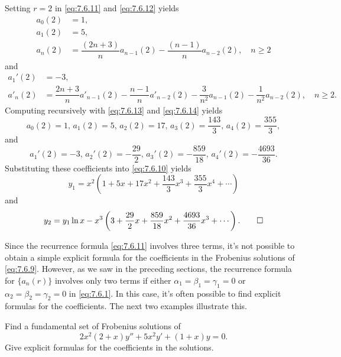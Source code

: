 \begin{solution}
Setting $r=2$ in \eqref{eq:7.6.11} and \eqref{eq:7.6.12} yields
\begin{equation} \label{eq:7.6.13}
\begin{aligned}
a_0(2)&=1,\\
a_1(2)&=5,\\
a_n(2)&=\dfrac{(2n+3)}{n}
a_{n-1}(2)-\dfrac{(n-1)}{n}a_{n-2}(2),\quad n\ge2
\end{aligned}
\end{equation}
and
\begin{equation} \label{eq:7.6.14}
\begin{aligned}
a_1'(2)&=-3,\\
a'_n(2)&=\dfrac{2n+3}{n}a'_{n-1}(2)-\dfrac{n-1}{n}a'_{n-2}(2)
-\dfrac{3}{n^2}a_{n-1}(2)-\dfrac{1}{n^2}a_{n-2}(2),\quad n\ge2.
\end{aligned}
\end{equation}
Computing recursively with \eqref{eq:7.6.13} and \eqref{eq:7.6.14}
yields
\[
a_0(2)=1,\,a_1(2)=5,\,a_2(2)=17,\,a_3(2)=\frac{143}{3},\,a_4(2)=\frac{355}{3},
\]
and
\[
a_1'(2)=-3,\,a_2'(2)=-\frac{29}{2},\,a_3'(2)=-\frac{859}{18},
\,a_4'(2)=-\frac{4693}{36}.
\]
Substituting these coefficients into \eqref{eq:7.6.10} yields
\[
y_1=x^2\left(1+5x+17x^2+\frac{143}{3}x^3
+\frac{355}{3}x^4+\cdots\right)
\]
and
\[
y_2=y_1 \ln x
-x^3\left(3+\frac{29}{2}x+\frac{859}{18}x^2+\frac{4693}{36}x^3
+\cdots\right). \qedhere
\]
\end{solution}

Since the recurrence formula \eqref{eq:7.6.11} involves three terms, it's
not possible to obtain a simple explicit formula for the coefficients
in the Frobenius solutions of \eqref{eq:7.6.9}. However, as we saw in the
preceding sections, the recurrence formula for $\{a_n(r)\}$ involves
only two terms if either $\alpha_1=\beta_1=\gamma_1=0$ or
$\alpha_2=\beta_2=\gamma_2=0$ in \eqref{eq:7.6.1}. In this case, it's
often
possible to find explicit formulas for the coefficients. The next two
examples illustrate this.



\begin{example}\label{example:7.6.2}
Find a fundamental set of Frobenius  solutions of
\begin{equation} \label{eq:7.6.15}
2x^2(2+x)y''+5x^2y'+(1+x)y=0.
\end{equation}
Give explicit formulas for the coefficients in the solutions.
\end{example}

